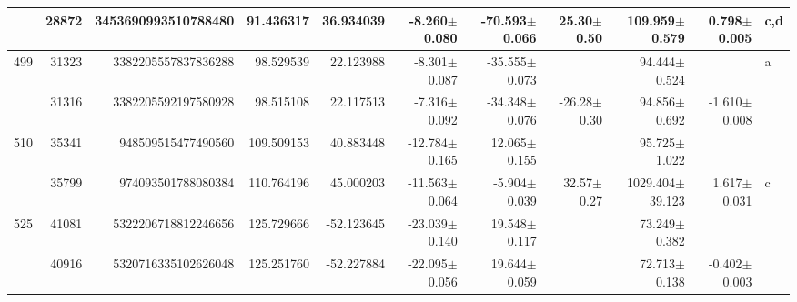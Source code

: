 \documentclass{ws-ijmpd}
\begin{document}
\begin{landscape}
\begin{longtable}{rrrrrrrrrrl}
            &   28872 &      3453690993510788480 &                    91.436317 &                    36.934039 &                 -8.260$\pm$0.080 &                -70.593$\pm$0.066 &          25.30$\pm$  0.50 &       109.959$\pm$0.579 &                           0.798$\pm$0.005 &                                                c,d \\
 \hline 499 &   31323 &      3382205557837836288 &                    98.529539 &                    22.123988 &                 -8.301$\pm$0.087 &                -35.555$\pm$0.073 &                           &        94.444$\pm$0.524 &                                           &                                                  a \\
            &   31316 &      3382205592197580928 &                    98.515108 &                    22.117513 &                 -7.316$\pm$0.092 &                -34.348$\pm$0.076 &         -26.28$\pm$  0.30 &        94.856$\pm$0.692 &                          -1.610$\pm$0.008 &                                                    \\
 \hline 510 &   35341 &       948509515477490560 &                   109.509153 &                    40.883448 &                -12.784$\pm$0.165 &                 12.065$\pm$0.155 &                           &        95.725$\pm$1.022 &                                           &                                                    \\
            &   35799 &       974093501788080384 &                   110.764196 &                    45.000203 &                -11.563$\pm$0.064 &                 -5.904$\pm$0.039 &          32.57$\pm$  0.27 &     1029.404$\pm$39.123 &                           1.617$\pm$0.031 &                                                  c \\
 \hline 525 &   41081 &      5322206718812246656 &                   125.729666 &                   -52.123645 &                -23.039$\pm$0.140 &                 19.548$\pm$0.117 &                           &        73.249$\pm$0.382 &                                           &                                                    \\
            &   40916 &      5320716335102626048 &                   125.251760 &                   -52.227884 &                -22.095$\pm$0.056 &                 19.644$\pm$0.059 &                           &        72.713$\pm$0.138 &                          -0.402$\pm$0.003 &                                                    \\

\end{longtable}
\end{landscape}
\end{document}
